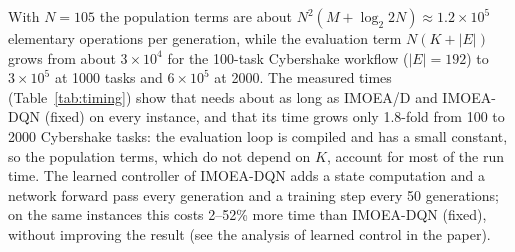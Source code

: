 With $N = 105$ the population terms are about $N^2(M + \log_2 2N) \approx 1.2 \times 10^5$ elementary operations per
generation, while the evaluation term $N(K + |E|)$ grows from about $3 \times 10^4$ for the 100-task Cybershake
workflow ($|E| = 192$) to $3 \times 10^5$ at 1000 tasks and $6 \times 10^5$ at 2000. The measured times
(Table~\ref{tab:timing}) show that \ours{} needs about as long as IMOEA/D and IMOEA-DQN (fixed) on every
instance, and that its time grows only 1.8-fold from 100 to 2000 Cybershake tasks: the evaluation loop is compiled and
has a small constant, so the population terms, which do not depend on $K$, account for most of the run time. The
learned controller of IMOEA-DQN adds a state computation and a network forward pass every generation and a training
step every 50 generations; on the same instances this costs 2--52\% more time than IMOEA-DQN (fixed), without
improving the result (see the analysis of learned control in the paper).
